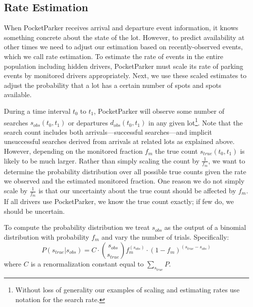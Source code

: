 \subsection{Rate Estimation}

When PocketParker receives arrival and departure event information, it knows
something concrete about the state of the lot. However, to predict
availability at other times we need to adjust our estimation based on
recently-observed events, which we call rate estimation. To estimate the rate
of events in the entire population including hidden drivers, PocketParker
must scale its rate of parking events by monitored drivers appropriately.
Next, we use these scaled estimates to adjust the probability that a lot has
a certain number of spots and spots available.

During a time interval $t_0$ to $t_1$, PocketParker will observe some number
of searches $s_{obs}(t_0, t_1)$ or departures $d_{obs}(t_0, t_1)$ in any
given lot\footnote{Without loss of generality our examples of scaling and
estimating rates use notation for the search rate.}. Note that the search
count includes both arrivals---successful searches---and implicit
unsuccessful searches derived from arrivals at related lots as explained
above. However, depending on the monitored fraction $f_m$ the true count
$s_{true}(t_0, t_1)$ is likely to be much larger. Rather than simply scaling
the count by $\frac{1}{f_m}$, we want to determine the probability
distribution over all possible true counts given the rate we observed and the
estimated monitored fraction. One reason we do not simply scale by
$\frac{1}{f_m}$ is that our uncertainty about the true count should be
affected by $f_m$. If all drivers use PocketParker, we know the true count
exactly; if few do, we should be uncertain.

To compute the probability distribution we treat $s_{obs}$ as the output of a
binomial distribution with probability $f_m$ and vary the number of trials.
Specifically:
%
\begin{equation} P(s_{true}| s_{obs}) = C \cdot {s_{obs} \choose s_{true}}
f_m^{(s_{obs})} \cdot (1 - f_m)^{(s_{true} - s_{obs})} \end{equation}
%
where $C$ is a renormalization constant equal to $\sum_{s_{true}} P$.

